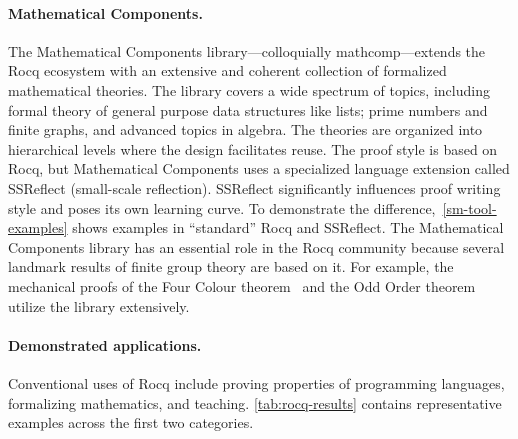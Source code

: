 \paragraph*{Mathematical Components.}
The Mathematical Components library---colloquially mathcomp---extends the Rocq ecosystem with an extensive and coherent collection of formalized mathematical theories.
The library covers a wide spectrum of topics, including formal theory of general purpose data structures like lists;
prime numbers and finite graphs, and advanced topics in algebra.
The theories are organized into hierarchical levels where the design facilitates reuse.
The proof style is based on Rocq, but Mathematical Components uses a specialized language extension called SSReflect (small-scale reflection).
SSReflect significantly influences proof writing style and poses its own learning curve.
To demonstrate the difference,~\autoref{sm-tool-examples} shows examples in \enquote{standard} Rocq and SSReflect.
The Mathematical Components library has an essential role in the Rocq community because several landmark results of finite group theory are based on it.
For example, the mechanical proofs of the Four Colour theorem~\cite{gonthier2008} and the Odd Order theorem~\cite{gonthier2013} utilize the library extensively.

\paragraph*{Demonstrated applications.}
Conventional uses of Rocq include proving properties of programming languages, formalizing mathematics, and teaching.
\autoref{tab:rocq-results} contains representative examples across the first two categories.

